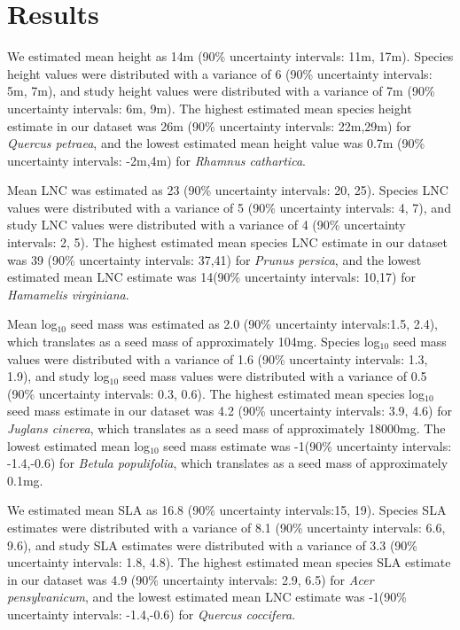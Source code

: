 \documentclass{article}\usepackage[]{graphicx}\usepackage[]{color}
\begin{document}
\section{Results}

We estimated mean height as 14m (90\% uncertainty intervals: 11m, 17m). Species height values were distributed with a variance of 6 (90\% uncertainty intervals: 5m, 7m), and study height values were distributed with a variance of 7m (90\% uncertainty intervals: 6m, 9m). The highest estimated mean species height estimate in our dataset was 26m (90\% uncertainty intervals: 22m,29m) for \textit{Quercus petraea}, and the lowest estimated mean height value was 0.7m (90\% uncertainty intervals: -2m,4m) for \textit{Rhamnus cathartica}. 

Mean LNC was estimated as 23 (90\% uncertainty intervals: 20, 25). Species LNC values were distributed with a variance of 5 (90\% uncertainty intervals: 4, 7), and study LNC values were distributed with a variance of 4 (90\% uncertainty intervals: 2, 5). The highest estimated mean species LNC estimate in our dataset was 39 (90\% uncertainty intervals: 37,41) for \textit{Prunus persica}, and the lowest estimated mean LNC estimate was 14(90\% uncertainty intervals: 10,17) for \textit{Hamamelis virginiana}.

Mean log$_{10}$ seed mass was estimated as 2.0 (90\% uncertainty intervals:1.5, 2.4), which translates as a seed mass of approximately 104mg. Species log$_{10}$ seed mass values were distributed with a variance of 1.6 (90\% uncertainty intervals: 1.3, 1.9), and study log$_{10}$ seed mass values were distributed with a variance of 0.5 (90\% uncertainty intervals: 0.3, 0.6). The highest estimated mean species log$_{10}$ seed mass estimate in our dataset was 4.2 (90\% uncertainty intervals: 3.9, 4.6) for \textit{Juglans cinerea}, which translates as a seed mass of approximately 18000mg. The lowest estimated mean log$_{10}$ seed mass estimate was -1(90\% uncertainty intervals: -1.4,-0.6) for \textit{Betula populifolia}, which translates as a seed mass of approximately 0.1mg.

We estimated mean SLA as 16.8 (90\% uncertainty intervals:15, 19). Species SLA estimates were distributed with a variance of 8.1 (90\% uncertainty intervals: 6.6, 9.6), and study SLA estimates were distributed with a variance of 3.3 (90\% uncertainty intervals: 1.8, 4.8). The highest estimated mean species SLA estimate in our dataset was 4.9 (90\% uncertainty intervals: 2.9, 6.5) for \textit{Acer pensylvanicum}, and the lowest estimated mean LNC estimate was -1(90\% uncertainty intervals: -1.4,-0.6) for \textit{Quercus coccifera}.
\end{document}
